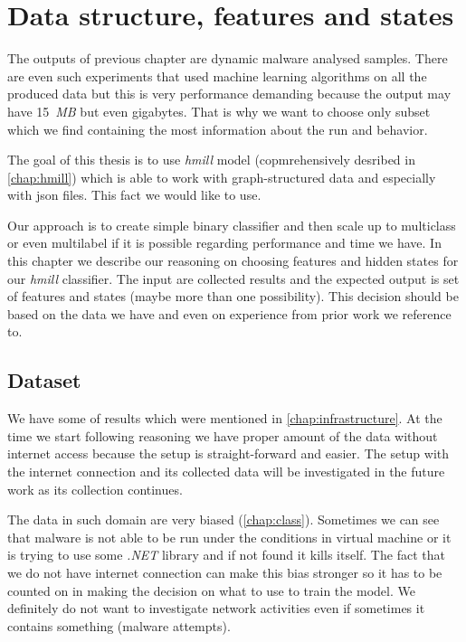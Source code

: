 \chapter{Data structure, features and states} \label{chap:data}


The outputs of previous chapter are dynamic malware analysed samples. There are even such experiments that used machine learning algorithms on all the produced data but this is very performance demanding because the output may have 15~\emph{MB} but even gigabytes. That is why we want to choose only subset which we find containing the most information about the run and behavior. 

The goal of this thesis is to use \emph{hmill} model (copmrehensively desribed in \ref{chap:hmill}) which is able to work with graph-structured data and especially with json files. This fact we would like to use.

Our approach is to create simple binary classifier and then scale up to multiclass or even multilabel if it is possible regarding performance and time we have. In this chapter we describe our reasoning on choosing features and hidden states for our \emph{hmill} classifier. The input are collected results and the expected output is set of features and states (maybe more than one possibility). This decision should be based on the data we have and even on experience from prior work we reference to.


\section{Dataset}
We have some of results which were mentioned in \ref{chap:infrastructure}. At the time we start following reasoning we have proper amount of the data without internet access because the setup is straight-forward and easier. The setup with the internet connection and its collected data will be investigated in the future work as its collection continues. 

The data in such domain are very biased (\ref{chap:class}). Sometimes we can see that malware is not able to be run under the conditions in virtual machine or it is trying to use some \emph{.NET} library and if not found it kills itself. The fact that we do not have internet connection can make this bias stronger so it has to be counted on in making the decision on what to use to train the model. We definitely do not want to investigate network activities even if sometimes it contains something (malware attempts).

